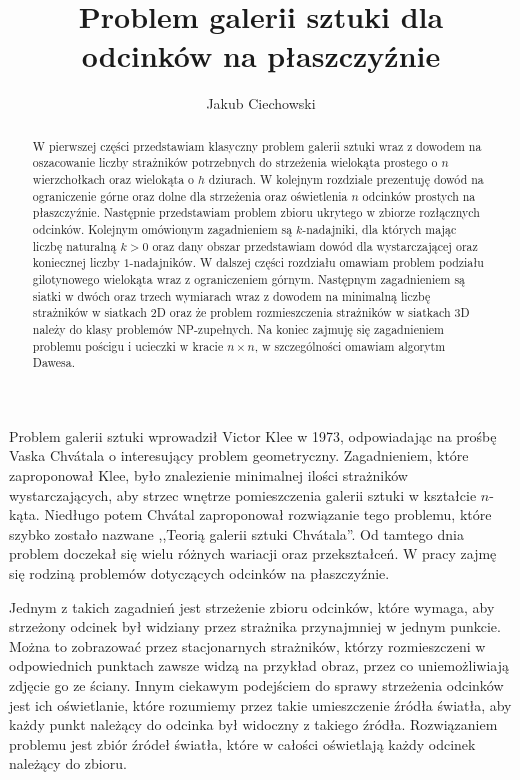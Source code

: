 \documentclass[brudnopis]{xmgr}
\author   {Jakub Ciechowski}
\title    {Problem galerii sztuki \newline dla odcinków na płaszczyźnie}
\date     {\ymdtoday}
\theoremstyle{definition}
\begin{document}
\begin{abstract}
 W pierwszej części przedstawiam klasyczny problem galerii sztuki wraz z dowodem na oszacowanie liczby strażników potrzebnych do strzeżenia wielokąta prostego o $n$ wierzchołkach oraz wielokąta o $h$ dziurach. W kolejnym rozdziale prezentuję dowód na ograniczenie górne oraz dolne dla strzeżenia oraz oświetlenia $n$ odcinków prostych na płaszczyźnie. Następnie przedstawiam problem zbioru ukrytego w zbiorze rozłącznych odcinków. Kolejnym omówionym zagadnieniem są $k$-nadajniki, dla których mając liczbę naturalną $k > 0$ oraz dany obszar przedstawiam dowód dla wystarczającej oraz koniecznej liczby $1$-nadajników. W dalszej części rozdziału omawiam problem podziału gilotynowego wielokąta wraz z ograniczeniem górnym. Następnym zagadnieniem są siatki w dwóch oraz trzech wymiarach wraz z dowodem na minimalną liczbę strażników w siatkach 2D oraz że problem rozmieszczenia strażników w siatkach 3D należy do klasy problemów NP-zupełnych. Na koniec zajmuję się zagadnieniem problemu pościgu i ucieczki w kracie $n \times n$, w szczególności omawiam algorytm Dawesa.
\end{abstract}

\maketitle

\introduction
Problem galerii sztuki wprowadził Victor Klee w 1973, odpowiadając na prośbę Vaska Chv\'atala o interesujący problem geometryczny. Zagadnieniem, które zaproponował Klee, było znalezienie minimalnej ilości strażników wystarczających, aby strzec wnętrze pomieszczenia galerii sztuki w kształcie $n$-kąta. Niedługo potem Chv\'atal zaproponował rozwiązanie tego problemu, które szybko zostało nazwane ,,Teorią galerii sztuki Chv\'atala''. Od tamtego dnia problem doczekał się wielu różnych wariacji oraz przekształceń. W pracy zajmę się rodziną problemów dotyczących odcinków na płaszczyźnie. 

Jednym z takich zagadnień jest strzeżenie zbioru odcinków, które wymaga, aby strzeżony odcinek był widziany przez strażnika przynajmniej w jednym punkcie. Można to zobrazować przez stacjonarnych strażników, którzy rozmieszczeni w odpowiednich punktach zawsze widzą na przykład obraz, przez co uniemożliwiają zdjęcie go ze ściany. Innym ciekawym podejściem do sprawy strzeżenia odcinków jest ich oświetlanie, które  rozumiemy przez takie umieszczenie źródła światła, aby każdy punkt należący do odcinka był widoczny z takiego źródła. Rozwiązaniem problemu jest zbiór źródeł światła, które w całości oświetlają każdy odcinek należący do zbioru. 
\end{document}
